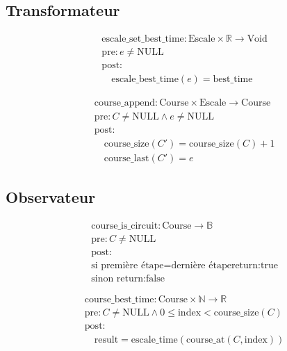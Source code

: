 \subsection{Transformateur}

\[
\begin{aligned}
&\text{escale\_set\_best\_time}: \text{Escale} \times \mathbb{R} \to \text{Void} \\
&\text{pre}: e \neq \text{NULL} \\
&\text{post}: \\
&\quad \text{escale\_best\_time}(e) = \text{best\_time}
\end{aligned}
\]

\[
\begin{aligned}
&\text{course\_append}: \text{Course} \times \text{Escale} \to \text{Course} \\
&\text{pre}: C \neq \text{NULL} \land e \neq \text{NULL} \\
&\text{post}: \\
&\quad \text{course\_size}(C') = \text{course\_size}(C) + 1 \\
&\quad \text{course\_last}(C') = e
\end{aligned}
\]


\subsection{Observateur}



\[
\begin{aligned}
&\text{course\_is\_circuit}: \text{Course} \to \mathbb{B} \\
&\text{pre}: C \neq \text{NULL} \\
&\text{post}: \\
&\text{si } \text{première étape} = \text{dernière étape} \text{return:true} \\
&\text{sinon return:false}
\end{aligned}
\]



\[
\begin{aligned}
&\text{course\_best\_time}: \text{Course} \times \mathbb{N} \to \mathbb{R} \\
&\text{pre}: C \neq \text{NULL} \land 0 \leq \text{index} < \text{course\_size}(C) \\
&\text{post}: \\
&\quad \text{result} = \text{escale\_time}(\text{course\_at}(C, \text{index}))
\end{aligned}
\]



